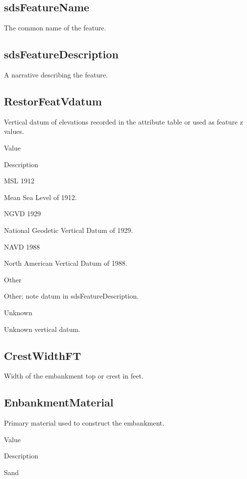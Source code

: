 \documentclass[
  letterpaper,
  DIV=11,
  numbers=noendperiod]{scrreprt}
\begin{document}
\subsection{sdsFeatureName}\label{sdsfeaturename-1}

The common name of the feature.

\subsection{sdsFeatureDescription}\label{sdsfeaturedescription-1}

A narrative describing the feature.

\subsection{RestorFeatVdatum}\label{restorfeatvdatum-1}

Vertical datum of elevations recorded in the attribute table or used as
feature z values.

Value

Description

MSL 1912

Mean Sea Level of 1912.

NGVD 1929

National Geodetic Vertical Datum of 1929.

NAVD 1988

North American Vertical Datum of 1988.

Other

Other; note datum in sdsFeatureDescription.

Unknown

Unknown vertical datum.

\subsection{CrestWidthFT}\label{crestwidthft}

Width of the embankment top or crest in feet.

\subsection{EnbankmentMaterial}\label{enbankmentmaterial}

Primary material used to construct the embankment.

Value

Description

Sand
\end{document}
